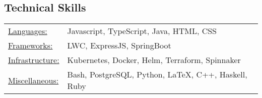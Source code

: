 \documentclass[12pt]{res}
\begin{document}
\begin{resume}
% 

\section{Technical Skills}
\begin{tabular}{l p{4in}}
    \underline{Languages:} & Javascript, TypeScript, Java, HTML, CSS \\
    \underline{Frameworks:} & LWC, ExpressJS, SpringBoot \\
    \underline{Infrastructure:} & Kubernetes, Docker, Helm, Terraform, Spinnaker \\
    \underline{Miscellaneous:} & Bash, PostgreSQL, Python, \LaTeX, C++, Haskell, Ruby \\
\end{tabular}

\end{resume}
\end{document}
